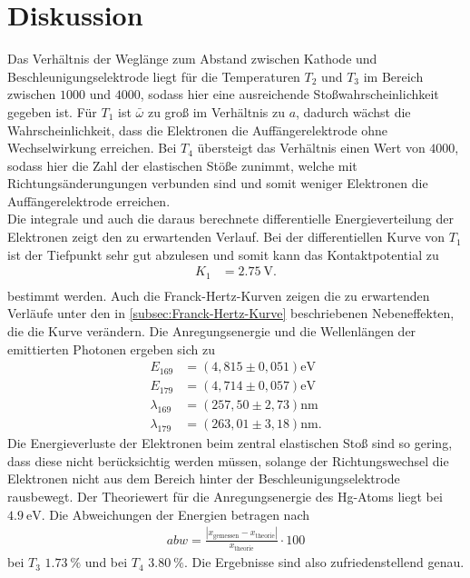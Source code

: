 \section{Diskussion}
\label{sec:Diskussion}

Das Verhältnis der Weglänge zum Abstand zwischen Kathode und Beschleunigungselektrode liegt für die Temperaturen $T_2$ und $T_3$
im Bereich zwischen $1000$ und $4000$, sodass hier eine ausreichende Stoßwahrscheinlichkeit gegeben ist.
Für $T_1$ ist $\bar{\omega}$ zu groß im Verhältnis zu $a$, dadurch wächst die Wahrscheinlichkeit, dass die Elektronen die Auffängerelektrode
ohne Wechselwirkung erreichen.
Bei $T_4$ übersteigt das Verhältnis einen Wert von $4000$, sodass hier die Zahl der elastischen Stöße zunimmt, welche mit 
Richtungsänderungungen verbunden sind und somit weniger Elektronen die Auffängerelektrode erreichen.\\

Die integrale und auch die daraus berechnete differentielle Energieverteilung der Elektronen zeigt den zu erwartenden Verlauf.
Bei der differentiellen Kurve von $T_1$ ist der Tiefpunkt sehr gut abzulesen und somit kann das Kontaktpotential zu 
\begin{align*}
    K_1 &= \qty{2.75}{\volt}.\\
\end{align*}
bestimmt werden.
Auch die Franck-Hertz-Kurven zeigen die zu erwartenden Verläufe unter den in \autoref{subsec:Franck-Hertz-Kurve} beschriebenen Nebeneffekten,
die die Kurve verändern.
Die Anregungsenergie und die Wellenlängen der emittierten Photonen ergeben sich zu
\begin{align*}
    E_{169} &= (4,815 \pm 0,051) \si{\electronvolt}\\
    E_{179} &= (4,714 \pm 0,057) \si{\electronvolt}\\
    \lambda_{169} &= (257,50 \pm 2,73) \si{\nano\meter}\\
    \lambda_{179} &= (263,01 \pm 3,18) \si{\nano\meter}.
\end{align*}
Die Energieverluste der Elektronen beim zentral elastischen Stoß sind
so gering, dass diese nicht berücksichtig werden müssen, solange der Richtungswechsel die 
Elektronen nicht aus dem Bereich hinter der Beschleunigungselektrode rausbewegt.
Der Theoriewert für die Anregungsenergie des Hg-Atoms liegt bei $\qty{4.9}{\electronvolt}$\cite{Anregungsenergie}.
Die Abweichungen der Energien betragen nach 
\begin{align*}
    abw=\frac{|x_\mathrm{gemessen}-x_\mathrm{theorie}|}{x_\mathrm{theorie}}\cdot 100 \label{eqn:abweich}
\end{align*}
bei $T_3$ $\qty{1.73}{\percent}$ und bei $T_4$ $\qty{3.80}{\percent}$.
Die Ergebnisse sind also zufriedenstellend genau.\\


